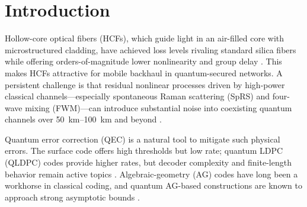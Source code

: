 \begin{abstract}
Hollow-core fibers (HCFs) provide ultra-low nonlinearity and latency for next-generation mobile backhaul. In co-propagation, however, intense classical channels induce noise—most notably spontaneous Raman scattering (SpRS) and four-wave mixing (FWM)—that degrades quantum links over long spans. We propose an algebraic-geometry-inspired CSS quantum error-correcting code (QECC) tailored to entanglement distribution over a \SI{\getvalue{length_km}}{\kilo\meter} HCF carrying a \SI{\getvalue{classical_power_dBm}}{\dBm} classical channel. Our design is paired with a deeply pipelined belief-propagation decoder architecture (DABP) amenable to FPGA deployment and a physics-driven noise model that captures asymmetric and temporally correlated Pauli errors. Idealized bounded-distance-decoding (BDD) upper bounds suggest that our code can achieve an entanglement fidelity of \(F_e\approx\num{\getvalue{F_e}}\) under the proposed HCF noise; preliminary BP simulations under the same model indicate a modest gap, yielding \(F_e\approx\num{\getvalue{F_e_BP}}\). The proposed DABP architecture is estimated to achieve sub-\SI{1}{\micro\second} latency with feasible resource and power on a Xilinx Kintex UltraScale (XCKU040). These results highlight a practical path for robust, low-latency quantum key distribution over HCF backhaul, subject to decoder-performance refinements.
\end{abstract}

\section{Introduction}
Hollow-core optical fibers (HCFs), which guide light in an air-filled core with microstructured cladding, have achieved loss levels rivaling standard silica fibers while offering orders-of-magnitude lower nonlinearity and group delay \cite{Poletti2014OPEX,Benabid2006JLT}. This makes HCFs attractive for mobile backhaul in quantum-secured networks. A persistent challenge is that residual nonlinear processes driven by high-power classical channels—especially spontaneous Raman scattering (SpRS) and four-wave mixing (FWM)—can introduce substantial noise into coexisting quantum channels over \SIrange{50}{100}{\kilo\meter} and beyond \cite{Eraerds2010NJP,Patel2012PRX,Kumar2015NJP}.

Quantum error correction (QEC) is a natural tool to mitigate such physical errors. The surface code offers high thresholds but low rate; quantum LDPC (QLDPC) codes provide higher rates, but decoder complexity and finite-length behavior remain active topics \cite{Kovalev2013PRA,Panteleev2022STOC}. Algebraic-geometry (AG) codes have long been a workhorse in classical coding, and quantum AG-based constructions are known to approach strong asymptotic bounds \cite{Ashikhmin2001PRA,ChenLing2008TIT,TsfasmanVladutZink1982MN}.

